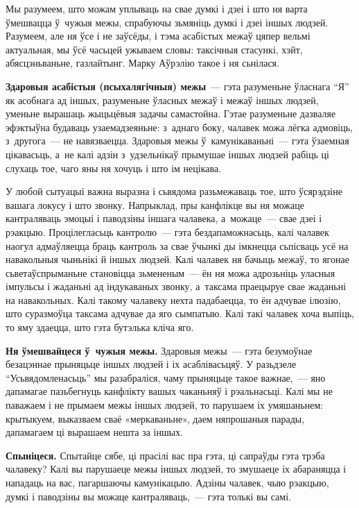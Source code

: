 Мы разумеем, што можам уплываць на свае думкі і дзеі і што ня варта ўмешвацца ў~чужыя межы, спрабуючы зьмяніць думкі і дзеі іншых людзей. Разумеем, але ня ўсе і не заўсёды, і тэма асабістых межаў цяпер вельмі актуальная, мы ўсё часьцей ужываем словы: таксічныя стасункі, хэйт, абясцэньваньне, газлайтынг. Марку Аўрэлію такое і ня сьнілася.

\textbf{Здаровыя асабістыя (псыхалягічныя) межы}~--- гэта разуменьне ўласнага ``Я'' як асобнага ад іншых, разуменьне ўласных межаў і межаў іншых людзей, уменьне вырашаць жыцьцёвыя задачы самастойна. Гэтае разуменьне дазваляе эфэктыўна будаваць узаемадзеяньне: з~аднаго боку, чалавек можа лёгка адмовіць, з~другога~--- не навязваецца. Здаровыя межы ў~камунікаваньні~--- гэта ўзаемная цікавасьць, а~не калі адзін з~удзельнікаў прымушае іншых людзей рабіць ці слухаць тое, чаго яны ня хочуць і што ім нецікава.

У любой сытуацыі важна выразна і сьвядома разьмежаваць тое, што ўсярэдзіне вашага локусу і што звонку. Напрыклад, пры канфлікце вы ня можаце кантраляваць эмоцыі і паводзіны іншага чалавека, а~можаце~--- свае дзеі і рэакцыю. Процілегласьць кантролю~--- гэта бездапаможнасьць, калі чалавек наогул адмаўляецца браць кантроль за свае ўчынкі ды імкнецца сьпісваць усё на навакольныя чыньнікі й іншых людзей. Калі чалавек ня бачыць межаў, то ягонае сьветаўспрыманьне становіцца зьмененым~--- ён ня можа адрозьніць уласныя імпульсы і жаданьні ад індукаваных звонку, а~таксама праецыруе свае жаданьні на навакольных. Калі такому чалавеку нехта падабаецца, то ён адчувае ілюзію, што суразмоўца таксама адчувае да яго сымпатыю. Калі такі чалавек хоча выпіць, то яму здаецца, што гэта бутэлька кліча яго.

\textbf{Ня ўмешвайцеся ў~чужыя межы.} Здаровыя межы~--- гэта безумоўнае безацэннае прыняцьце іншых людзей і іх асаблівасьцяў. У разьдзеле ``Усьвядомленасьць'' мы разабраліся, чаму прыняцьце такое важнае,~--- яно дапамагае пазьбегнуць канфлікту вашых чаканьняў і рэальнасьці. Калі мы не паважаем і не прымаем межы іншых людзей, то парушаем іх умяшаньнем: крытыкуем, выказваем сваё «меркаваньне», даем няпрошаныя парады, дапамагаем ці вырашаем нешта за іншых. 

\textbf{Спыніцеся.} Спытайце сябе, ці прасілі вас пра гэта, ці сапраўды гэта трэба чалавеку? Калі вы парушаеце межы іншых людзей, то змушаеце іх абараняцца і нападаць на вас, пагаршаючы камунікацыю. Адзіны чалавек, чыю рэакцыю, думкі і паводзіны вы можаце кантраляваць,~--- гэта толькі вы самі.


